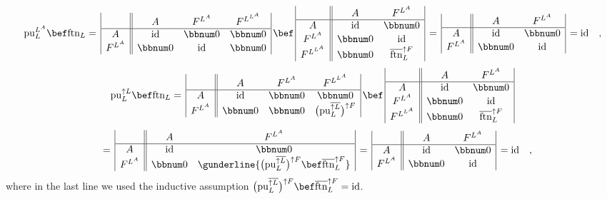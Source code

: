 \[
\text{pu}_{L}^{L^{A}}\bef\text{ftn}_{L}=\,\begin{array}{|c||ccc|}
 & A & F^{L^{A}} & F^{L^{L^{A}}}\\
\hline A & \text{id} & \bbnum 0 & \bbnum 0\\
F^{L^{A}} & \bbnum 0 & \text{id} & \bbnum 0
\end{array}\,\bef\,\begin{array}{|c||cc|}
 & A & F^{L^{A}}\\
\hline A & \text{id} & \bbnum 0\\
F^{L^{A}} & \bbnum 0 & \text{id}\\
F^{L^{L^{A}}} & \bbnum 0 & \overline{\text{ftn}}_{L}^{\uparrow F}
\end{array}\,=\,\begin{array}{|c||cc|}
 & A & F^{L^{A}}\\
\hline A & \text{id} & \bbnum 0\\
F^{L^{A}} & \bbnum 0 & \text{id}
\end{array}\,=\text{id}\quad,
\]
\[
\text{pu}_{L}^{\uparrow L}\bef\text{ftn}_{L}=\,\begin{array}{|c||ccc|}
 & A & F^{L^{A}} & F^{L^{L^{A}}}\\
\hline A & \text{id} & \bbnum 0 & \bbnum 0\\
F^{L^{A}} & \bbnum 0 & \bbnum 0 & \big(\text{pu}_{L}^{\overline{\uparrow L}}\big)^{\uparrow F}
\end{array}\,\bef\,\begin{array}{|c||cc|}
 & A & F^{L^{A}}\\
\hline A & \text{id} & \bbnum 0\\
F^{L^{A}} & \bbnum 0 & \text{id}\\
F^{L^{L^{A}}} & \bbnum 0 & \overline{\text{ftn}}_{L}^{\uparrow F}
\end{array}
\]
\[
\quad=\,\begin{array}{|c||cc|}
 & A & F^{L^{A}}\\
\hline A & \text{id} & \bbnum 0\\
F^{L^{A}} & \bbnum 0 & \gunderline{\big(\text{pu}_{L}^{\overline{\uparrow L}}\big)^{\uparrow F}\bef\overline{\text{ftn}}_{L}^{\uparrow F}}
\end{array}\,=\,\begin{array}{|c||cc|}
 & A & F^{L^{A}}\\
\hline A & \text{id} & \bbnum 0\\
F^{L^{A}} & \bbnum 0 & \text{id}
\end{array}\,=\text{id}\quad,
\]
where in the last line we used the inductive assumption $\big(\text{pu}_{L}^{\overline{\uparrow L}}\big)^{\uparrow F}\bef\overline{\text{ftn}}_{L}^{\uparrow F}=\text{id}$.

